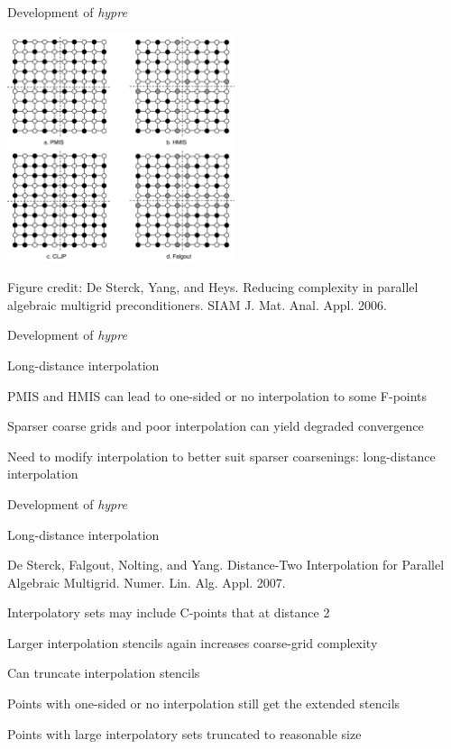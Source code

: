 \documentclass[18pt,xcolor=table]{beamer}
\begin{document}
\begin{frame}{Development of \emph{hypre}}
\begin{center}
\includegraphics[width=0.5\textwidth]{../figures/parCoarsening}
\end{center}
\tiny{Figure credit: De Sterck, Yang, and Heys. Reducing complexity in parallel algebraic multigrid preconditioners. SIAM J. Mat. Anal. Appl. 2006.}
\end{frame}

\begin{frame}{Development of \emph{hypre}}
\begin{block}{Long-distance interpolation}
\bit
\item PMIS and HMIS can lead to one-sided or no interpolation to some F-points
\item Sparser coarse grids and poor interpolation can yield degraded convergence
\item Need to modify interpolation to better suit sparser coarsenings: long-distance interpolation
\eit
\end{block}
\end{frame}

\begin{frame}{Development of \emph{hypre}}
\begin{block}{Long-distance interpolation}
\bit
\item De Sterck, Falgout, Nolting, and Yang. Distance-Two Interpolation for Parallel Algebraic Multigrid. Numer. Lin. Alg. Appl. 2007.
\item Interpolatory sets may include C-points that at distance 2
\item Larger interpolation stencils again increases coarse-grid complexity
\item Can truncate interpolation stencils
\bit
\item Points with one-sided or no interpolation still get the extended stencils
\item Points with large interpolatory sets truncated to reasonable size
\eit
\eit
\end{block}
\end{frame}
\end{document}
